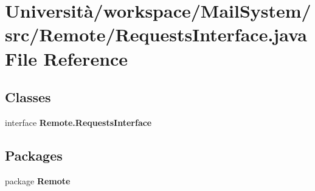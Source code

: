 \section{Università/workspace/\+Mail\+System/src/\+Remote/\+Requests\+Interface.java File Reference}
\label{_requests_interface_8java}
\subsection*{Classes}
\begin{DoxyCompactItemize}
\item 
interface \textbf{ Remote.\+Requests\+Interface}
\end{DoxyCompactItemize}
\subsection*{Packages}
\begin{DoxyCompactItemize}
\item 
package \textbf{ Remote}
\end{DoxyCompactItemize}

